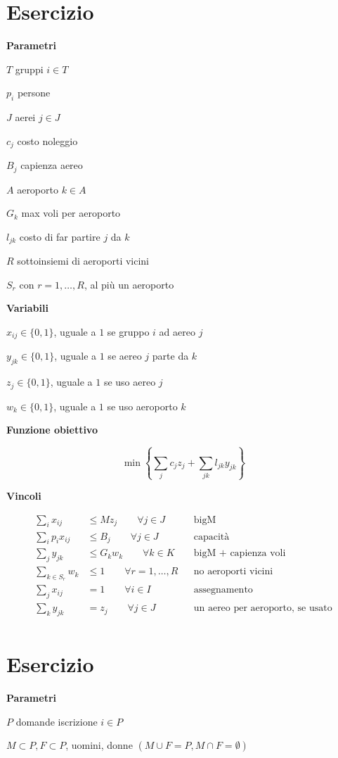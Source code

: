 \documentclass[10pt,a4paper,twoside,openright]{book}
\newcounter{es}
\newcommand{\Es}{
	\stepcounter{es}
	\section{Esercizio \arabic{es}}
	}
\numberwithin{es}{chapter}
\newcommand{\Par}{\textbf{Parametri}}
\newcommand{\Var}{\textbf{Variabili}}
\newcommand{\Fob}{\textbf{Funzione obiettivo}}
\newcommand{\Vin}{\textbf{Vincoli}}
\begin{document}
\Es

\Par

$T$ gruppi $i\in T$

$p_{i}$ persone

$J$ aerei $j\in J$

$c_{j}$ costo noleggio

$B_{j}$ capienza aereo

$A$ aeroporto $k\in A$

$G_{k}$ max voli per aeroporto

$l_{jk}$ costo di far partire $j$ da $k$

$R$ sottoinsiemi di aeroporti vicini

$S_{r}$ con $r=1,\dotsc ,R$, al più un aeroporto

\Var

$x_{ij} \in \{0,1\}$, uguale a $1$ se gruppo $i$ ad aereo $j$

$y_{jk} \in \{0,1\}$, uguale a $1$ se aereo $j$ parte da $k$

$z_{j} \in \{0,1\}$, uguale a $1$ se uso aereo $j$

$w_{k} \in \{0,1\}$, uguale a $1$ se uso aeroporto $k$

\Fob

\begin{equation*}
	\min\left\{\sum _{j} c_{j} z_{j} +\sum _{jk} l_{jk} y_{jk}\right\}
\end{equation*}

\Vin

\begin{align*}
	\sum _{i} x_{ij} &\leq Mz_{j} \qquad\forall j\in J && \text{bigM} \\
	\sum _{i} p_{i} x_{ij} &\leq B_{j} \qquad\forall j\in J && \text{capacità} \\
	\sum _{j} y_{jk} &\leq G_{k} w_{k} \qquad\forall k\in K && \text{bigM + capienza voli} \\
	\sum _{k\in S_{r}} w_{k} &\leq 1\qquad\forall r=1,\dotsc ,R && \text{no aeroporti vicini} \\
	\sum _{j} x_{ij} &=1\qquad\forall i\in I && \text{assegnamento} \\
	\sum _{k} y_{jk} &=z_{j} \qquad\forall j\in J && \text{un aereo per aeroporto, se usato} \\
\end{align*}

\Es

\Par

$P$ domande iscrizione $i\in P$

$M\subset P,F\subset P$, uomini, donne $( M\cup F=P,M\cap F=\emptyset )$
\end{document}
